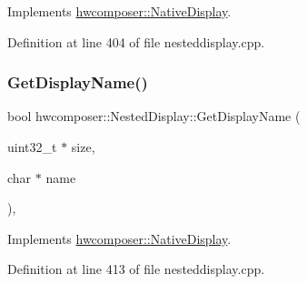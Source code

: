 Implements \mbox{\hyperlink{classhwcomposer_1_1NativeDisplay_a9479dcf82765996db6d7ea1cdcef3864}{hwcomposer\+::\+Native\+Display}}.



Definition at line 404 of file nesteddisplay.\+cpp.


\begin{DoxyCode}{0}
\end{DoxyCode}
\mbox{\label{classhwcomposer_1_1NestedDisplay_a0a1ca305ffa0ace0c2bd5ff601db9b18}} 
\subsubsection{\texorpdfstring{Get\+Display\+Name()}{GetDisplayName()}}
{\footnotesize\ttfamily bool hwcomposer\+::\+Nested\+Display\+::\+Get\+Display\+Name (\begin{DoxyParamCaption}\item[{uint32\+\_\+t $\ast$}]{size,  }\item[{char $\ast$}]{name }\end{DoxyParamCaption})\hspace{0.3cm}{\ttfamily [override]}, {\ttfamily [virtual]}}



Implements \mbox{\hyperlink{classhwcomposer_1_1NativeDisplay_a28c095d6d08c84e40b5d5160d038f0b5}{hwcomposer\+::\+Native\+Display}}.



Definition at line 413 of file nesteddisplay.\+cpp.


